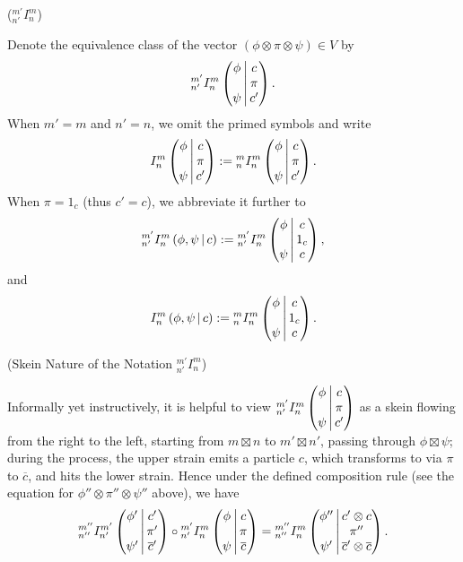 \begin{notation} (${}^{m'}_{n'}I^{m}_{n}$)

  \noindent Denote the equivalence class of the vector
  $(\phi \otimes \pi \otimes \psi) \in V$ by
  \[\III{m'}{n'}{m}{n}{\phi}{\psi}{c}{\pi}{c'}.\]
  When $m' = m$ and $n' = n$, we omit the primed symbols and write
  \[
    \III{}{}{m}{n}{\phi}{\psi}{c}{\pi}{c'} :=
    \III{m}{n}{m}{n}{\phi}{\psi}{c}{\pi}{c'}.
  \]
  When $\pi = 1_{c}$ (thus $c' = c$), we abbreviate it further to
  \[
    \II{m'}{n'}{m}{n}{\phi}{\psi}{c} :=
    \III{m'}{n'}{m}{n}{\phi}{\psi}{c}{1_{c}}{c},
  \]
  and
  \[
    \II{}{}{m}{n}{\phi}{\psi}{c} :=
    \III{m}{n}{m}{n}{\phi}{\psi}{c}{1_{c}}{c}.
  \]
\end{notation}

\begin{remark} (Skein Nature of the Notation ${}^{m'}_{n'}I^{m}_{n}$)

  \noindent Informally yet instructively, it is helpful to view
  $\III{m'}{n'}{m}{n}{\phi}{\psi}{c}{\pi}{c'}$ as a skein flowing from the
  right to the left, starting from $m \boxtimes n$ to $m' \boxtimes n'$,
  passing through $\phi \boxtimes \psi$; during the process, the upper strain
  emits a particle $c$, which transforms to via $\pi$ to $\overline{c}$, and
  hits the lower strain. Hence under the defined composition rule (see the
  equation for $\phi'' \otimes \pi'' \otimes \psi''$ above), we have
  \[
    \III{m''}{n''}{m'}{n'}{\phi'}{\psi'}{c'}{\pi'}{\overline{c}'} \circ
    \III{m'}{n'}{m}{n}{\phi}{\psi}{c}{\pi}{\overline{c}} =
    \III{m''}{n''}{m}{n}{\phi''}{\psi'}{c' \otimes c}{\pi''}{\overline{c}' \otimes \overline{c}}.
  \]
\end{remark}

